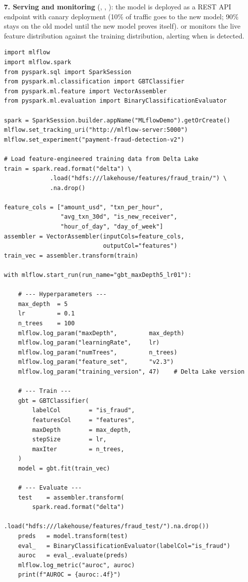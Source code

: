 \textbf{7. Serving and monitoring} (, ,
): the model is deployed as a REST API endpoint with
canary deployment (10\% of traffic goes to the new model; 90\% stays
on the old model until the new model proves itself). 
or  monitors the live feature distribution against the training
distribution, alerting when  is detected.

\begin{lstlisting}[style=pyspark, caption={MLflow experiment tracking and
  model registration in PySpark}]
import mlflow
import mlflow.spark
from pyspark.sql import SparkSession
from pyspark.ml.classification import GBTClassifier
from pyspark.ml.feature import VectorAssembler
from pyspark.ml.evaluation import BinaryClassificationEvaluator

spark = SparkSession.builder.appName("MLflowDemo").getOrCreate()
mlflow.set_tracking_uri("http://mlflow-server:5000")
mlflow.set_experiment("payment-fraud-detection-v2")

# Load feature-engineered training data from Delta Lake
train = spark.read.format("delta") \
             .load("hdfs:///lakehouse/features/fraud_train/") \
             .na.drop()

feature_cols = ["amount_usd", "txn_per_hour",
                "avg_txn_30d", "is_new_receiver",
                "hour_of_day", "day_of_week"]
assembler = VectorAssembler(inputCols=feature_cols,
                            outputCol="features")
train_vec = assembler.transform(train)

with mlflow.start_run(run_name="gbt_maxDepth5_lr01"):

    # --- Hyperparameters ---
    max_depth  = 5
    lr         = 0.1
    n_trees    = 100
    mlflow.log_param("maxDepth",         max_depth)
    mlflow.log_param("learningRate",     lr)
    mlflow.log_param("numTrees",         n_trees)
    mlflow.log_param("feature_set",      "v2.3")
    mlflow.log_param("training_version", 47)    # Delta Lake version

    # --- Train ---
    gbt = GBTClassifier(
        labelCol        = "is_fraud",
        featuresCol     = "features",
        maxDepth        = max_depth,
        stepSize        = lr,
        maxIter         = n_trees,
    )
    model = gbt.fit(train_vec)

    # --- Evaluate ---
    test    = assembler.transform(
        spark.read.format("delta")
             .load("hdfs:///lakehouse/features/fraud_test/").na.drop())
    preds   = model.transform(test)
    eval_   = BinaryClassificationEvaluator(labelCol="is_fraud")
    auroc   = eval_.evaluate(preds)
    mlflow.log_metric("auroc", auroc)
    print(f"AUROC = {auroc:.4f}")


\end{lstlisting}
